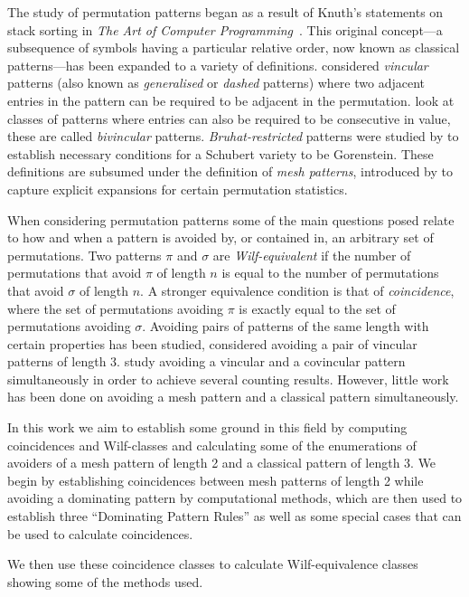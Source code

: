 The study of permutation patterns began as a result of Knuth's statements on
stack sorting in \emph{The Art of Computer Programming}~\cite[p.~243,
Ex.~5,6]{Knuth:1997:ACP:260999}. This original concept---a subsequence of
symbols having a particular relative order, now known as classical
patterns---has been expanded to a variety of definitions.
\textcite{babstein2000} considered \emph{vincular} patterns (also known as
\emph{generalised} or \emph{dashed} patterns) where two adjacent entries in the
pattern can be required to be adjacent in the permutation. \textcite{MR2652101}
look at classes of patterns where entries can also be required to be consecutive in
value, these are called \emph{bivincular} patterns. \emph{Bruhat-restricted}
patterns were studied by \textcite{MR2264071} to establish necessary conditions
for a Schubert variety to be Gorenstein. These definitions are subsumed under
the definition of \emph{mesh patterns}, introduced by
\textcite{journals/combinatorics/BrandenC11} to capture explicit expansions for
certain permutation statistics.

When considering permutation patterns some of the main questions posed relate to
how and when a pattern is avoided by, or contained in, an arbitrary set of
permutations. Two patterns \(\pi\) and \(\sigma\) are \emph{Wilf-equivalent} if
the number of permutations that avoid \(\pi\) of length \(n\) is equal to the
number of permutations that avoid \(\sigma\) of length \(n\). A stronger
equivalence condition is that of \emph{coincidence}, where the set of
permutations avoiding \(\pi\) is exactly equal to the set of permutations
avoiding \(\sigma\). Avoiding pairs of patterns of the same length with certain
properties has been studied, \textcite{MR2178749} considered avoiding
a pair of vincular patterns of length 3. \textcite{2015arXiv151203226B} study
avoiding a vincular and a covincular pattern simultaneously in order to achieve
several counting results. However, little work has been done on
avoiding a mesh pattern and a classical pattern simultaneously.

In this work we aim to establish some ground in this field by computing
coincidences and Wilf-classes and calculating some of the enumerations of
avoiders of a mesh pattern of length 2 and a classical pattern of length 3. We
begin by establishing coincidences between mesh patterns of length 2 while
avoiding a dominating pattern by computational methods, which are then
used to establish three ``Dominating Pattern Rules'' as well as some special cases
that can be used to calculate coincidences.

 We then use these coincidence classes
to calculate Wilf-equivalence classes showing some of the methods used.